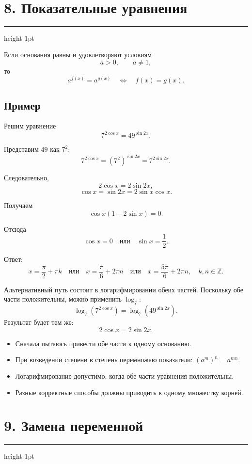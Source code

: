 \documentclass[a4paper,12pt]{article}
\newcommand{\checkitem}{\item[$\square$]}
\newcommand{\Z}{\mathbb{Z}}
\newcommand{\sectionrule}{%
  \vspace{-2mm}
  {\color{lightaccent}\hrule height 1pt}
  \vspace{3mm}
}
\begin{document}

\section*{\textcolor{darkaccent}{8. Показательные уравнения}}
\sectionrule

Если основания равны и удовлетворяют условиям
\[
a>0,\qquad a\ne1,
\]
то
\[
a^{f(x)}=a^{g(x)}
\quad\Longleftrightarrow\quad
f(x)=g(x).
\]

\subsection*{\textcolor{accent}{Пример}}

Решим уравнение
\[
7^{2\cos x}=49^{\sin2x}.
\]

Представим \(49\) как \(7^2\):
\[
7^{2\cos x}
=
\left(7^2\right)^{\sin2x}
=
7^{2\sin2x}.
\]

Следовательно,
\[
2\cos x=2\sin2x,
\]
\[
\cos x=\sin2x=2\sin x\cos x.
\]

Получаем
\[
\cos x(1-2\sin x)=0.
\]

Отсюда
\[
\cos x=0
\quad\text{или}\quad
\sin x=\frac12.
\]

Ответ:
\[
\boxed{
x=\frac{\pi}{2}+\pi k
\quad\text{или}\quad
x=\frac{\pi}{6}+2\pi n
\quad\text{или}\quad
x=\frac{5\pi}{6}+2\pi n,
\quad k,n\in\Z.
}
\]

Альтернативный путь состоит в логарифмировании обеих частей.
Поскольку обе части положительны, можно применить \(\log_7\):
\[
\log_7\left(7^{2\cos x}\right)
=
\log_7\left(49^{\sin2x}\right).
\]
Результат будет тем же:
\[
2\cos x=2\sin2x.
\]

\begin{itemize}
  \checkitem Сначала пытаюсь привести обе части к одному основанию.
  \checkitem При возведении степени в степень перемножаю показатели:
        \((a^m)^n=a^{mn}\).
  \checkitem Логарифмирование допустимо, когда обе части уравнения положительны.
  \checkitem Разные корректные способы должны приводить к одному множеству корней.
\end{itemize}


\section*{\textcolor{darkaccent}{9. Замена переменной}}
\sectionrule
\end{document}
